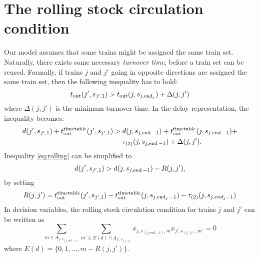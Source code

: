 \section{The rolling stock circulation condition}
Our model assumes that some trains might be assigned the same train set. Naturally,
there exists some necessary \emph{turnover time}, before a train set can be
reused. Formally, if trains $j$ and $j'$ going in opposite directions are
assigned the same train set, then the following inequality has to hold:
\begin{equation}
  t_\text{out}(j', s_{j',1}) > t_\text{out}(j, s_{j,\operatorname*{end}_{j}}) + \Delta(j, j')
\end{equation}
where $\Delta(j, j')$ is the minimum turnover time. In the delay
representation, the inequality becomes:
\begin{equation}
  \label{eq:rolling}
  \begin{split}
    d(j',s_{j',1}) + t_\text{out}^\text{timetable}(j',s_{j',1}) > & \; d(j, s_{j,\operatorname*{end}-1}) + t_\text{out}^\text{timetable}(j, s_{j,\operatorname*{end}-1}) + \\
    & \; \tau_{(2)}(j, s_{j,\operatorname*{end}-1}) + \Delta(j,j').
  \end{split}
\end{equation}
Inequality \eqref{eq:rolling} can be simplified to
\begin{equation}
  d(j',s_{j',1}) > d(j, s_{j,\operatorname*{end}-1}) - R(j,j'),
\end{equation}
by setting
\begin{equation}
  \label{eq:rolling2}
  R(j, j') = t_\text{out}^\text{timetable}(j',s_{j',1}) - t_\text{out}^\text{timetable}(j, s_{j,\operatorname*{end}_{j}-1}) - \tau_{(2)}(j,s_{j,end_{j}-1})
\end{equation}
In decision variables, the rolling stock circulation condition for trains $j$
and $j'$ can be written as
\begin{equation}
  \label{eq:qubo:rollingstock}
  \sum_{m \in A_{j, s_{(j, end-1)}}} \sum_{m' \in E(d) \cap A_{j',s_{(j',1)}}} x_{j,s_{(j,end-1)},m}x_{j', s_{(j',1)},m'} = 0
\end{equation}
where $E(d) = \{0, 1, \ldots, m-R(j, j')\}$.

